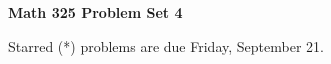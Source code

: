 \documentclass[12pt]{article}
\begin{document}
\def\ctln{\centerline}
\def\msk{\medskip}
\def\bsk{\bigskip}
\def\ssk{\smallskip}
\def\hsk{\hskip.3in}
\def\ra{\rightarrow}
\def\ubr{\underbar}
\def\dsp{\displaystyle}

\def\mt{{\mathcal T}}
\def\mb{{\mathcal B}}
\def\ms{{\mathcal S}}
\def\mu{{\mathcal U}}
\def\mv{{\mathcal V}}

\def\bbr{{\mathbb R}}
\def\bbz{{\mathbb Z}}
\def\bbq{{\mathbb Q}}
\def\bbn{{\mathbb N}}
\def\spc{$~$\hskip.15in$~$}

\def\sset{\subseteq}
\def\del{\partial}
\def\lra{$\Leftrightarrow$}
\def\bra{$\Rightarrow$}




\ctln{\bf Math 325 Problem Set 4}

\msk

\ctln{Starred (*) problems are due Friday, September 21.}
\end{document}
